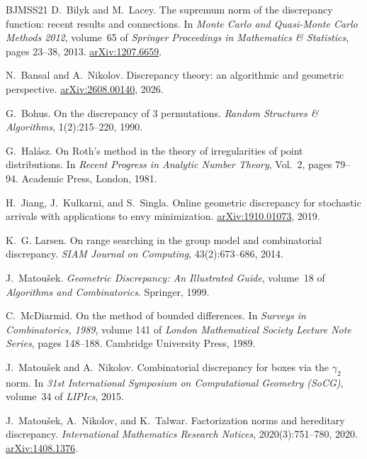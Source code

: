 \documentclass[11pt,letterpaper]{article}
\newcommand{\1}{\mathbf{1}}
\begin{document}
\begin{thebibliography}{BJMSS21}
D.~Bilyk and M.~Lacey.
\newblock The supremum norm of the discrepancy function: recent results and connections.
\newblock In \emph{Monte Carlo and Quasi-Monte Carlo Methods 2012}, volume~65 of \emph{Springer Proceedings in Mathematics \& Statistics}, pages 23--38, 2013. \href{https://arxiv.org/abs/1207.6659}{arXiv:1207.6659}.

N.~Bansal and A.~Nikolov.
\newblock Discrepancy theory: an algorithmic and geometric perspective.
\newblock \href{https://arxiv.org/abs/2608.00140}{arXiv:2608.00140}, 2026.

G.~Bohus.
\newblock On the discrepancy of 3 permutations.
\newblock \emph{Random Structures \& Algorithms}, 1(2):215--220, 1990.

G.~Hal\'asz.
\newblock On Roth's method in the theory of irregularities of point distributions.
\newblock In \emph{Recent Progress in Analytic Number Theory}, Vol.~2, pages 79--94. Academic Press, London, 1981.

H.~Jiang, J.~Kulkarni, and S.~Singla.
\newblock Online geometric discrepancy for stochastic arrivals with applications to envy minimization.
\newblock \href{https://arxiv.org/abs/1910.01073}{arXiv:1910.01073}, 2019.

K.~G. Larsen.
\newblock On range searching in the group model and combinatorial discrepancy.
\newblock \emph{SIAM Journal on Computing}, 43(2):673--686, 2014.

J.~Matou\v{s}ek.
\newblock \emph{Geometric Discrepancy: An Illustrated Guide}, volume~18 of \emph{Algorithms and Combinatorics}.
\newblock Springer, 1999.

C.~McDiarmid.
\newblock On the method of bounded differences.
\newblock In \emph{Surveys in Combinatorics, 1989}, volume 141 of \emph{London Mathematical Society Lecture Note Series}, pages 148--188. Cambridge University Press, 1989.

J.~Matou\v{s}ek and A.~Nikolov.
\newblock Combinatorial discrepancy for boxes via the $\gamma_2$ norm.
\newblock In \emph{31st International Symposium on Computational Geometry (SoCG)}, volume~34 of \emph{LIPIcs}, 2015.

J.~Matou\v{s}ek, A.~Nikolov, and K.~Talwar.
\newblock Factorization norms and hereditary discrepancy.
\newblock \emph{International Mathematics Research Notices}, 2020(3):751--780, 2020. \href{https://arxiv.org/abs/1408.1376}{arXiv:1408.1376}.


\end{thebibliography}
\end{document}
